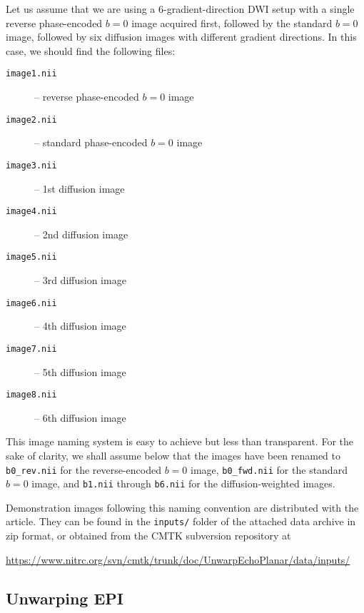 \documentclass{InsightArticle}
\begin{document}
Let us assume that we are using a 6-gradient-direction DWI setup with a single
reverse phase-encoded $b=0$ image acquired first, followed by the standard
$b=0$ image, followed by six diffusion images with different gradient
directions. In this case, we should find the following files:
\begin{description}
\item[\tt image1.nii] -- reverse phase-encoded $b=0$ image
\item[\tt image2.nii] -- standard phase-encoded $b=0$ image
\item[\tt image3.nii] -- 1st diffusion image
\item[\tt image4.nii] -- 2nd diffusion image
\item[\tt image5.nii] -- 3rd diffusion image
\item[\tt image6.nii] -- 4th diffusion image
\item[\tt image7.nii] -- 5th diffusion image
\item[\tt image8.nii] -- 6th diffusion image
\end{description}

This image naming system is easy to achieve but less than transparent. For the
sake of clarity, we shall assume below that the images have been renamed to
\verb|b0_rev.nii| for the reverse-encoded $b=0$ image, \verb|b0_fwd.nii| for
the standard $b=0$ image, and \verb|b1.nii| through \verb|b6.nii| for the
diffusion-weighted images.

Demonstration images following this naming convention are distributed with the
article. They can be found in the \verb|inputs/| folder of the attached data
archive in zip format, or obtained from the CMTK subversion repository at

\centerline{\url{https://www.nitrc.org/svn/cmtk/trunk/doc/UnwarpEchoPlanar/data/inputs/}}

\subsection{Unwarping EPI}
\end{document}
